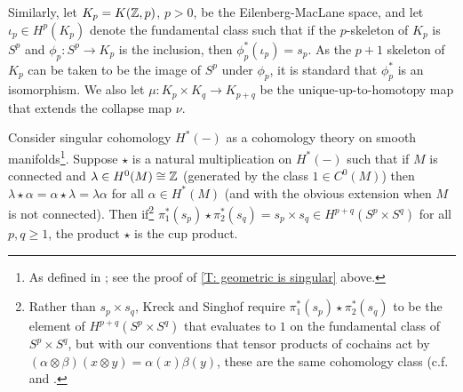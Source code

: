 Similarly, let $K_p=K(\mathbb{Z},p)$, $p>0$, be the Eilenberg-MacLane space, and let $\iota_p\in H^p(K_p)$ denote the fundamental class such that if the $p$-skeleton of $K_p$ is $S^p$ and $\phi_p:S^p\to K_p$ is the inclusion, then $\phi_p^*(\iota_p)=s_p$. As the $p+1$ skeleton of $K_p$ can be taken to be the image of $S^p$ under $\phi_p$, it is standard that $\phi_p^*$ is an isomorphism. 
We also let $\mu:K_p\times K_q\to K_{p+q}$ be the unique-up-to-homotopy map that extends the collapse map $\nu$. 


\begin{proposition}\label{P: Kreck-Singhof pairing}
Consider singular cohomology $H^*(-)$ as a cohomology theory on smooth manifolds\footnote{As defined in \cite{Krec10b}; see the proof of \cref{T: geometric is singular} above.}. Suppose $\star$ is a natural multiplication on $H^*(-)$ such that if $M$ is connected and $\lambda\in H^0(M)\cong \mathbb{Z}$ (generated by the class $1\in C^0(M)$) then $\lambda\star \alpha=\alpha\star \lambda=\lambda\alpha$ for all $\alpha\in H^*(M)$ (and with the obvious extension when $M$ is not connected). Then if\footnote{Rather than $s_p\times s_q$, Kreck and Singhof require $\pi_1^*(s_p) \star \pi_2^*(s_q)$ to be the element of $H^{p+q}(S^p\times S^q)$ that evaluates to $1$ on the fundamental class of $S^p\times S^q$, but with our conventions that tensor products of cochains act by $(\alpha\otimes \beta)(x\otimes y)=\alpha(x)\beta(y)$, these are the same cohomology class (c.f.\ \cite[page 245]{Span81} and \cite[Section 3B]{Hatc02}. } $\pi_1^*(s_p) \star \pi_2^*(s_q)=s_p\times s_q\in H^{p+q}(S^p\times S^q)$ for all $p,q\geq 1$, the product $\star$ is the cup product.
\end{proposition}
